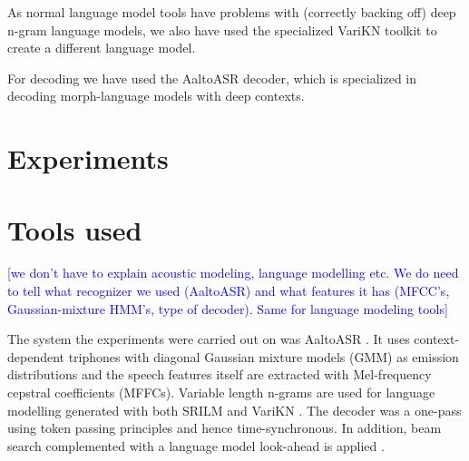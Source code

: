 \documentclass[10pt,b5paper,utf8]{article}
\newcommand{\note}[1]{{\textcolor{blue}{[#1]}}}
\begin{document}
As normal language model tools have problems with (correctly backing off) deep n-gram language models, we also have used the specialized VariKN toolkit to create a different language model.

For decoding we have used the AaltoASR decoder, which is specialized in decoding morph-language models with deep contexts.



\section{Experiments}

\section{Tools used}

\note{we don't have to explain acoustic modeling, language modelling etc. We do need to tell what recognizer we used (AaltoASR) and what features it has (MFCC's, Gaussian-mixture HMM's, type of decoder). Same for language modeling tools}


The system the experiments were carried out on was AaltoASR \cite{hirsimaki2009importance}\cite{pylkkonen2005efficient}. It uses context-dependent triphones with diagonal Gaussian mixture models (GMM) as emission distributions and the speech features itself are extracted with Mel-frequency cepstral coefficients (MFFCs). Variable length n-grams are used for language modelling generated with both SRILM and VariKN \cite{siivola2007growing}\cite{siivola2007morfessor}. The decoder was a one-pass using token passing principles and hence time-synchronous. In addition, beam search complemented with a language model look-ahead is applied \cite{ortmanns1997look}.
\end{document}
